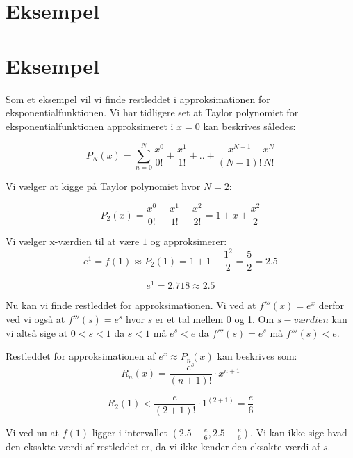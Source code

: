 
\section{Eksempel}

\section{Eksempel}
Som et eksempel vil vi finde restleddet i approksimationen for eksponentialfunktionen.
Vi har tidligere set at Taylor polynomiet for eksponentialfunktionen approksimeret i $x=0$ kan beskrives således:

\[
P_N(x)=\sum^{N}_{n=0}\frac{x^{0}}{0!}+\frac{x^{1}}{1!}+..+\frac{x^{N-1}}{(N-1)!}\frac{x^{N}}{N!}
\]

Vi vælger at kigge på Taylor polynomiet hvor $N=2$:

\[
P_2(x)=\frac{x^{0}}{0!}+\frac{x^{1}}{1!}+\frac{x^{2}}{2!}=1+x+\frac{x^{2}}{2}
\]

Vi vælger x-værdien til at være $1$ og approksimerer:
\[
e^{1}=f(1)\approx P_{2}(1)=1+1+\frac{1^{2}}{2}=\frac{5}{2}=2.5
\]

\[
e^{1}=2.718\approx 2.5
\]

Nu kan vi finde restleddet for approksimationen.
Vi ved at $f'''(x)=e^{x}$ derfor ved vi også at $f'''(s)=e^{s}$ hvor $s$ er et tal mellem 0 og 1. Om $s-værdien$ kan vi altså sige at $0<s<1$ da $s<1$ må $e^{s}<e$ da $f'''(s)=e^{s}$ må $f'''(s)<e$.

Restleddet for approksimationen af $e^{x}\approx P_n(x)$ kan beskrives som:
\[
R_n(x)={\frac{e^{s}}{(n+1)!}}\cdot x^{n+1}
\]

\[
R_2(1)<\frac{e}{(2+1)!}\cdot1^{(2+1)}=\frac{e}{6}
\]

Vi ved nu at $f(1)$ ligger i intervallet $(2.5-\frac{e}{6} , 2.5+\frac{e}{6})$. Vi kan ikke sige hvad den eksakte værdi af restleddet er, da vi ikke kender den eksakte værdi af $s$.
